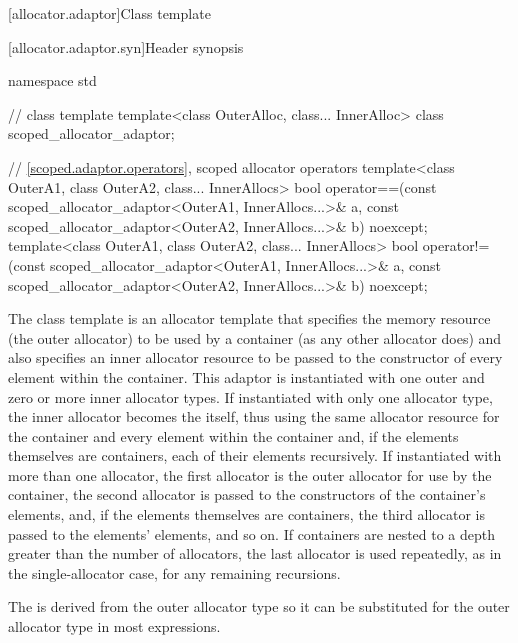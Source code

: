 [allocator.adaptor]{Class template }

[allocator.adaptor.syn]{Header  synopsis}

%
\begin{codeblock}
namespace std {
  // class template 
  template<class OuterAlloc, class... InnerAlloc>
    class scoped_allocator_adaptor;

  // \ref{scoped.adaptor.operators}, scoped allocator operators
  template<class OuterA1, class OuterA2, class... InnerAllocs>
    bool operator==(const scoped_allocator_adaptor<OuterA1, InnerAllocs...>& a,
                    const scoped_allocator_adaptor<OuterA2, InnerAllocs...>& b) noexcept;
  template<class OuterA1, class OuterA2, class... InnerAllocs>
    bool operator!=(const scoped_allocator_adaptor<OuterA1, InnerAllocs...>& a,
                    const scoped_allocator_adaptor<OuterA2, InnerAllocs...>& b) noexcept;
}
\end{codeblock}

\pnum
The class template  is an allocator template that
specifies the memory resource (the outer allocator) to be used by a container (as any
other allocator does) and also specifies an inner allocator resource to be passed to the
constructor of every element within the container. This adaptor is instantiated with one
outer and zero or more inner allocator types. If instantiated with only one allocator
type, the inner allocator becomes the  itself, thus
using the same allocator resource for the container and every element within the
container and, if the elements themselves are containers, each of their elements
recursively. If instantiated with more than one allocator, the first allocator is the
outer allocator for use by the container, the second allocator is passed to the
constructors of the container's elements, and, if the elements themselves are
containers, the third allocator is passed to the elements' elements, and so on. If
containers are nested to a depth greater than the number of allocators, the last
allocator is used repeatedly, as in the single-allocator case, for any remaining
recursions. \begin{note} The  is derived from the outer
allocator type so it can be substituted for the outer allocator type in most
expressions. \end{note}


